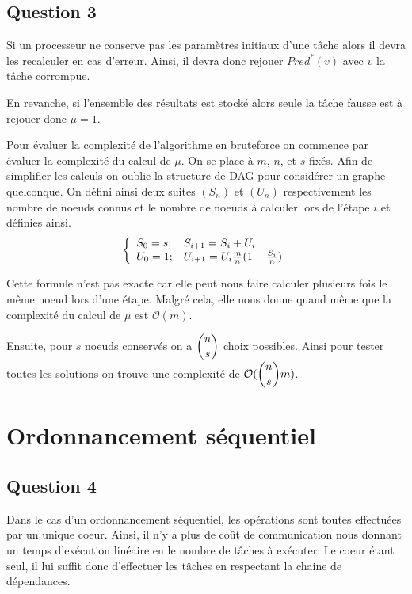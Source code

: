 \documentclass[11pt]{article}
\newenvironment{system}[1]
  {\left\{\begin{array}{#1}}
  {\end{array}\right.}
\begin{document}

  \subsection{Question 3}
    Si un processeur ne conserve pas les paramètres initiaux d'une tâche alors
    il devra les recalculer en cas d'erreur. Ainsi, il devra donc rejouer
    $Pred^*(v)$ avec $v$ la tâche corrompue.

    En revanche, si l'ensemble des résultats est stocké alors seule la tâche
    fausse est à rejouer donc $\mu = 1$.

    Pour évaluer la complexité de l'algorithme en bruteforce on commence par
    évaluer la complexité du calcul de $\mu$. On se place à $m$, $n$, et $s$
    fixés. Afin de simplifier les calculs on oublie la structure de DAG pour
    considérer un graphe quelconque. On défini ainsi deux suites $(S_n)$ et
    $(U_n)$ respectivement les nombre de noeuds connus et le nombre de noeuds
    à calculer lors de l'étape $i$ et définies ainsi.
    \[ \begin{system}{ll}
      S_0 = s ; & S_{i+1} = S_i + U_i \\
      U_0 = 1 ; & U_{i+1} = U_i \frac{m}{n} (1 - \frac{S_i}{n})
    \end{system} \]

    Cette formule n'est pas exacte car elle peut nous faire calculer plusieurs
    fois le même noeud lors d'une étape. Malgré cela, elle nous donne quand même
    que la complexité du calcul de $\mu$ est $\mathcal{O}(m)$.

    Ensuite, pour $s$ noeuds conservés on a $\dbinom{n}{s}$ choix possibles.
    Ainsi pour tester toutes les solutions on trouve une complexité de
    $\mathcal{O}(\dbinom{n}{s}m)$.

\section{Ordonnancement séquentiel}
  \subsection{Question 4}
    Dans le cas d'un ordonnancement séquentiel, les opérations sont toutes
    effectuées par un unique coeur. Ainsi, il n'y a plus de coût de
    communication nous donnant un temps d'exécution linéaire en le nombre de
    tâches à exécuter. Le coeur étant seul, il lui suffit donc d'effectuer les
    tâches en respectant la chaine de dépendances.
\end{document}
